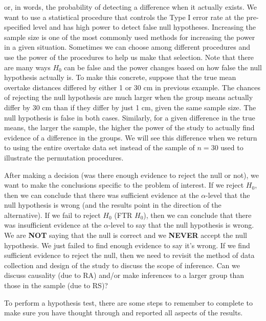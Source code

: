 \documentclass[
]{book}
\begin{document}

or, in words, the probability of detecting a difference when it actually
exists. We want to use a statistical procedure that controls the Type I error
rate at the pre-specified level and has high power to detect false null
hypotheses. Increasing the sample size is one of the most commonly used
methods for increasing the power  in a given situation. Sometimes we can choose
among different procedures and use the power of the procedures to help us make
that selection. Note that there are many ways \(H_0\) can be false and the power changes
based on how false the null hypothesis actually is. To make this concrete,
suppose that the true mean overtake distances differed by either 1 or 30 cm in
previous example. The chances of rejecting the null hypothesis are much larger
when the group means actually differ by 30 cm than if they differ by just 1 cm,
given the same sample size. The null hypothesis is false in both cases. Similarly, for a given difference in the true means, the larger
the sample, the higher the power  of the study to actually find evidence of a
difference in the groups. We will see this difference when we return to using the entire overtake data set instead of the sample of \(n = 30\) used to illustrate the permutation procedures.

\indent After making a decision (was there enough evidence to reject the null
or not), we want to make the conclusions specific to the problem of interest.
If we reject \(H_0\), then we can conclude that there was sufficient evidence at
the \(\alpha\)-level that the null hypothesis is wrong (and the results point in
the direction of the alternative). If we fail to reject \(H_0\) (FTR \(H_0\)), then
we can conclude that there was insufficient evidence at the \(\alpha\)-level to say
that the null hypothesis is wrong. We are \textbf{NOT} saying that the null is
correct and we \textbf{NEVER} accept the null hypothesis. We just failed to find
enough evidence to say it's wrong. If we find sufficient evidence to reject the
null, then we need to revisit the method of data collection and design of the
study to discuss the scope of inference.  Can we discuss causality (due to RA) and/or
make inferences to a larger group than those in the sample (due to RS)?

\indent To perform a hypothesis test, there are some steps to remember to
complete to make sure you have thought through and reported all aspects of the results.
\end{document}
